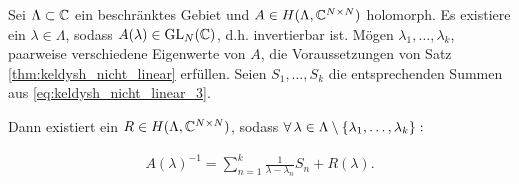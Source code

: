 \begin{corollary} \label{corr:keldysh_multi}

    Sei $\Lambda \subset \mathbb{C}$ ein beschränktes Gebiet und $A \in H(\Lambda, \mathbb{C}^{N \times N})$ holomorph.
    Es existiere ein $\lambda \in \Lambda$, sodass $A(\lambda) \in \operatorname{GL}_N(\mathbb{C})$, d.h. invertierbar ist.
    Mögen $\lambda_1, \dots, \lambda_k$, paarweise verschiedene Eigenwerte von $A$, die Voraussetzungen von Satz \ref{thm:keldysh_nicht_linear} erfüllen.
    Seien $S_1, \dots, S_k$ die entsprechenden Summen aus \eqref{eq:keldysh_nicht_linear_3}.

    Dann existiert ein $R \in H(\Lambda, \mathbb{C}^{N \times N})$, sodass $\forall \, \lambda \in \Lambda \setminus {\left \{ \lambda_1, \dots, \lambda_k \right \}}:$

    \begin{align*}
        A(\lambda)^{-1}
        =
        \sum_{n=1}^k
            \frac{1}{\lambda - \lambda_n} S_n
        +
        R(\lambda).
    \end{align*}

\end{corollary}
